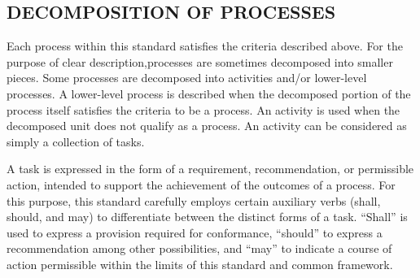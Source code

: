 	\subsection{DECOMPOSITION OF PROCESSES}
	\begin{adjustwidth}{0.5em}{0pt}

		Each process within this standard satisfies the criteria described above. For the purpose of clear description,processes are sometimes decomposed into smaller pieces. Some processes are decomposed into activities and/or lower-level processes. A lower-level process is described when the decomposed portion of the process itself satisfies the criteria to be a process. An activity is used when the decomposed unit does not qualify as a process. An activity can be considered as simply a collection of tasks.

		A task is expressed in the form of a requirement, recommendation, or permissible action, intended to support the achievement of the outcomes of a process. For this purpose, this standard carefully employs certain auxiliary verbs (shall, should, and may) to differentiate between the distinct forms of a task. ``Shall'' is used to express a provision required for conformance, ``should'' to express a recommendation among other possibilities, and ``may'' to indicate a course of action permissible within the limits of this standard and common framework.

	\end{adjustwidth}


